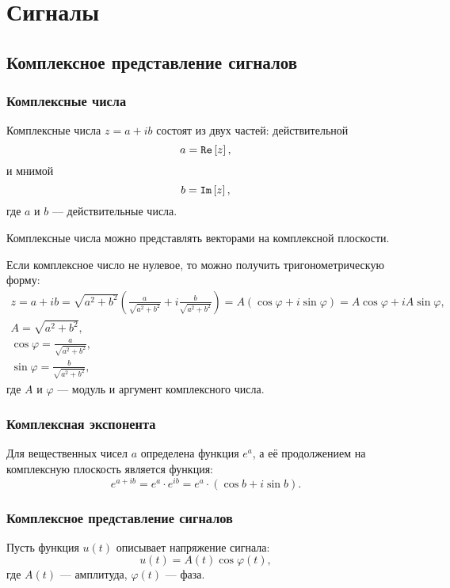 \chapter{Сигналы}


\section{Комплексное представление сигналов}

\subsection{Комплексные числа}

Комплексные числа $z = a + i b$ состоят из двух частей: действительной
\[
    a = \mathtt{Re} \left [ z \right ],
\]
и мнимой
\[
    b = \mathtt{Im} \left [ z \right ],
\]
где $a$ и $b$ --- действительные числа.

Комплексные числа можно представлять векторами на комплексной плоскости.

Если комплексное число не нулевое, то можно получить тригонометрическую форму:
\begin{gather*}
    z
    = a + i b
    = \sqrt{a^2 + b^2} \left ( \frac{a}{\sqrt{a^2 + b^2}} + i \frac{b}{\sqrt{a^2 + b^2}} \right )
    = A \left ( \cos \varphi + i \sin \varphi \right )
    = A \cos \varphi + i A \sin \varphi , \\
    A = \sqrt{a^2 + b^2} , \\
    \cos \varphi = \frac{a}{\sqrt{a^2 + b^2}} , \\
    \sin \varphi = \frac{b}{\sqrt{a^2 + b^2}} ,
\end{gather*}
где $A$ и $\varphi$ --- модуль и аргумент комплексного числа.

\subsection{Комплексная экспонента}

Для вещественных чисел $a$ определена функция $e^a$, а её продолжением на комплексную плоскость является функция:
\[
    e^{a + i b}
    = e^a \cdot e^{i b}
    = e^a \cdot \left ( \cos b + i \sin b \right ).
\]

\subsection{Комплексное представление сигналов}

Пусть функция $u(t)$ описывает напряжение сигнала:
\[
    u(t) = A(t) \cos \varphi(t) ,
\]
где $A(t)$ --- амплитуда, $\varphi(t)$ --- фаза.

